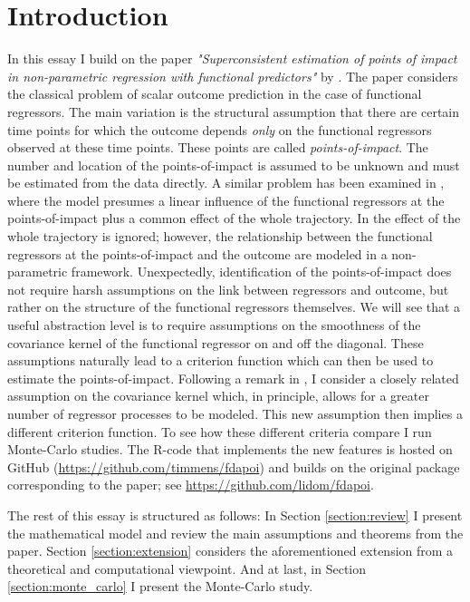 \section{Introduction}

In this essay I build on the paper \emph{"Superconsistent estimation of points of impact
in non-parametric regression with functional predictors"} by \cite{Kneip2020}. The paper
considers the classical problem of scalar outcome prediction in the case of functional
regressors. The main variation is the structural assumption that there are certain time
points for which the outcome depends \emph{only} on the functional regressors observed
at these time points. These points are called \emph{points-of-impact}. The number and
location of the points-of-impact is assumed to be unknown and must be estimated from the
data directly. A similar problem has been examined in \cite{Kneip2016}, where the model
presumes a linear influence of the functional regressors at the points-of-impact plus a
common effect of the whole trajectory. In \cite{Kneip2020} the effect of the whole
trajectory is ignored; however, the relationship between the functional regressors at
the points-of-impact and the outcome are modeled in a non-parametric framework.
Unexpectedly, identification of the points-of-impact does not require harsh assumptions
on the link between regressors and outcome, but rather on the structure of the
functional regressors themselves. We will see that a useful abstraction level is to
require assumptions on the smoothness of the covariance kernel of the functional
regressor on and off the diagonal. These assumptions naturally lead to a criterion
function which can then be used to estimate the points-of-impact. Following a remark in
\cite{Kneip2020}, I consider a closely related assumption on the covariance kernel
which, in principle, allows for a greater number of regressor processes to be modeled.
This new assumption then implies a different criterion function. To see how these
different criteria compare I run Monte-Carlo studies. The \textsf{R}-code that
implements the new features is hosted on GitHub
(\url{https://github.com/timmens/fdapoi}) and builds on the original package
corresponding to the paper; see \url{https://github.com/lidom/fdapoi}.

The rest of this essay is structured as follows: In Section \ref{section:review} I
present the mathematical model and review the main assumptions and theorems from the
paper. Section \ref{section:extension} considers the aforementioned extension from a
theoretical and computational viewpoint. And at last, in Section
\ref{section:monte_carlo} I present the Monte-Carlo study.

